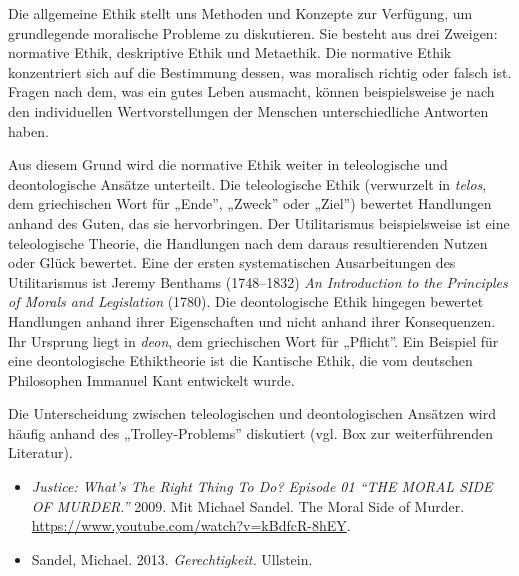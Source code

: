 \documentclass[
  nswissgerman,
  a4paper,
  DIV=11,
  numbers=noendperiod,
  oneside,
  openany]{scrreprt}
\begin{document}
Die allgemeine Ethik stellt uns Methoden und Konzepte zur Verfügung, um
grundlegende moralische Probleme zu diskutieren. Sie besteht aus drei
Zweigen: normative Ethik, deskriptive Ethik und Metaethik. Die normative
Ethik konzentriert sich auf die Bestimmung dessen, was moralisch richtig
oder falsch ist. Fragen nach dem, was ein gutes Leben ausmacht, können
beispielsweise je nach den individuellen Wertvorstellungen der Menschen
unterschiedliche Antworten haben.

Aus diesem Grund wird die normative Ethik weiter in teleologische und
deontologische Ansätze unterteilt. Die teleologische Ethik (verwurzelt
in \emph{telos}, dem griechischen Wort für „Ende'', „Zweck'' oder
„Ziel'') bewertet Handlungen anhand des Guten, das sie hervorbringen.
Der Utilitarismus beispielsweise ist eine teleologische Theorie, die
Handlungen nach dem daraus resultierenden Nutzen oder Glück bewertet.
Eine der ersten systematischen Ausarbeitungen des Utilitarismus ist
Jeremy Benthams (1748--1832) \emph{An Introduction to the Principles of
Morals and Legislation} (1780). Die deontologische Ethik hingegen
bewertet Handlungen anhand ihrer Eigenschaften und nicht anhand ihrer
Konsequenzen. Ihr Ursprung liegt in \emph{deon}, dem griechischen Wort
für „Pflicht''. Ein Beispiel für eine deontologische Ethiktheorie ist
die Kantische Ethik, die vom deutschen Philosophen Immanuel Kant
entwickelt wurde.

Die Unterscheidung zwischen teleologischen und deontologischen Ansätzen
wird häufig anhand des „Trolley-Problems'' diskutiert (vgl. Box zur
weiterführenden Literatur).

\begin{tcolorbox}[enhanced jigsaw, arc=.35mm, bottomrule=.15mm, bottomtitle=1mm, breakable, colback=white, colbacktitle=quarto-callout-caution-color!10!white, colframe=quarto-callout-caution-color-frame, coltitle=black, left=2mm, leftrule=.75mm, opacityback=0, opacitybacktitle=0.6, rightrule=.15mm, title={Weiterführende Literatur}, titlerule=0mm, toprule=.15mm, toptitle=1mm]

\begin{itemize}
\item
  \emph{Justice: What's The Right Thing To Do? Episode 01 ``THE MORAL
  SIDE OF MURDER.''} 2009. Mit Michael Sandel. The Moral Side of Murder.
  \url{https://www.youtube.com/watch?v=kBdfcR-8hEY}.
\item
  Sandel, Michael. 2013. \emph{Gerechtigkeit.} Ullstein.
\end{itemize}

\end{tcolorbox}
\end{document}

